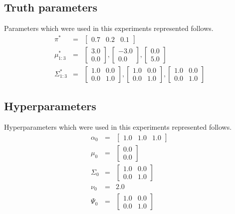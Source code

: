 \documentclass[a4paper]{article}
\begin{document}
\subsection{Truth parameters}
Parameters which were used in this experiments represented follows.
\begin{eqnarray}
	\pi^* &=& \left[ \begin{array}{ccc}
		0.7 & 0.2 & 0.1
	\end{array}
	\right]\\
	\mu^*_{1:3} &=& 
	\left[\begin{array}{c}
		3.0\\
		0.0
	\end{array}\right]
	, 
	\left[\begin{array}{c}
		-3.0\\
		0.0
	\end{array}\right]
	, 
	\left[\begin{array}{c}
		0.0\\
		5.0
	\end{array}\right]\\
	\Sigma^*_{1:3} &=& 
	\left[\begin{array}{cc}
		1.0 & 0.0\\
		0.0 & 1.0
	\end{array}\right]
	, 
	\left[\begin{array}{cc}
		1.0 & 0.0\\
		0.0 & 1.0
	\end{array}\right]
	, \left[\begin{array}{cc}
		1.0 & 0.0\\
		0.0 & 1.0
	\end{array}\right]
\end{eqnarray}

\subsection{Hyperparameters}
Hyperparameters which were used in this experiments represented follows.
\begin{eqnarray}
	\alpha_0 &=& \left[\begin{array}{ccc} 1.0 & 1.0 & 1.0 \end{array}\right]\\
	\mu_0 &=& \left[\begin{array}{c}
		0.0\\
		0.0
	\end{array}\right]\\
	\Sigma_0 &=& \left[\begin{array}{cc}
		1.0 & 0.0\\
		0.0 & 1.0
	\end{array}\right]\\
	\nu_0 &=& 2.0\\
	\Psi_0 &=& \left[\begin{array}{cc}
		1.0 & 0.0\\
		0.0 & 1.0
	\end{array}\right]
\end{eqnarray}
\end{document}
